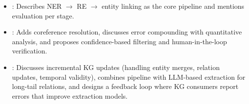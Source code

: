 \begin{interviewq}

\goodgreat
\begin{itemize}
    \item {}: Describes NER $\to$ RE $\to$ entity linking as the core pipeline
    and mentions evaluation per stage.
    \item {}: Adds coreference resolution, discusses error compounding with
    quantitative analysis, and proposes confidence-based filtering and human-in-the-loop
    verification.
    \item {}: Discusses incremental KG updates (handling entity merges, relation
    updates, temporal validity), combines pipeline with LLM-based extraction for long-tail
    relations, and designs a feedback loop where KG consumers report errors that improve
    extraction models.
\end{itemize}

\end{interviewq}

\vspace{0.5em}

